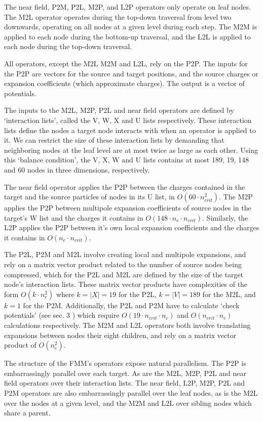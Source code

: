 \documentclass{IEEEcsmag}
\begin{document}
The near field, P2M, P2L, M2P, and L2P operators only operate on leaf nodes. The M2L operator operates during the top-down traversal from level two downwards, operating on all nodes at a given level during each step. The M2M is applied to each node during the bottom-up traversal, and the L2L is applied to each node during the top-down traversal. 

All operators, except the M2L M2M and L2L, rely on the P2P. The inputs for the P2P are vectors for the source and target positions, and the source charges or expansion coefficients (which approximate charges). The output is a vector of potentials. 

The inputs to the M2L, M2P, P2L and near field operators are defined by `interaction lists', called the V, W, X and U lists respectively. These interaction lists define the nodes a target node interacts with when an operator is applied to it. We can restrict the size of these interaction lists by demanding that neighboring nodes at the leaf level are at most twice as large as each other. Using this `balance condition', the V, X, W and U lists contains at most 189, 19, 148 and 60 nodes in three dimensions, respectively.

The near field operator applies the P2P between the charges contained in the target and the source particles of nodes in its U list, in $O(60 \cdot n_{crit}^2)$. The M2P applies the P2P between multipole expansion coefficients of source nodes in the target's W list and the charges it contains in $O(148 \cdot n_e \cdot n_{crit})$. Similarly, the L2P applies the P2P between it's own local expansion coefficients and the charges it contains in $O(n_e \cdot n_{crit})$.

The P2L, P2M and M2L involve creating local and multipole expansions, and rely on a matrix vector product related to the number of source nodes being compressed, which for the P2L and M2L are defined by the size of the target node's interaction lists. These matrix vector products have complexities of the form $O(k \cdot n_e^2)$ where $k = |X| = 19$ for the P2L, $k = |V| = 189$ for the M2L, and $k = 1$ for the P2M. Additionally, the P2L and P2M have to calculate `check potentials' (see sec. 3 \cite{Ying2004}) which require $O(19 \cdot n_{crit} \cdot n_c)$ and $O(n_{crit} \cdot n_c)$ calculations respectively. The M2M and L2L operators both involve translating expansions between nodes their eight children, and rely on a matrix vector product of $O(n_e^2)$.

The structure of the FMM's operators expose natural parallelism. The P2P is embarrassingly parallel over each target. As are the M2L, M2P, P2L and near field operators over their interaction lists. The near field, L2P, M2P, P2L and P2M operators are also embarrassingly parallel over the leaf nodes, as is the M2L over the nodes at a given level, and the M2M and L2L over sibling nodes which share a parent.
\end{document}
